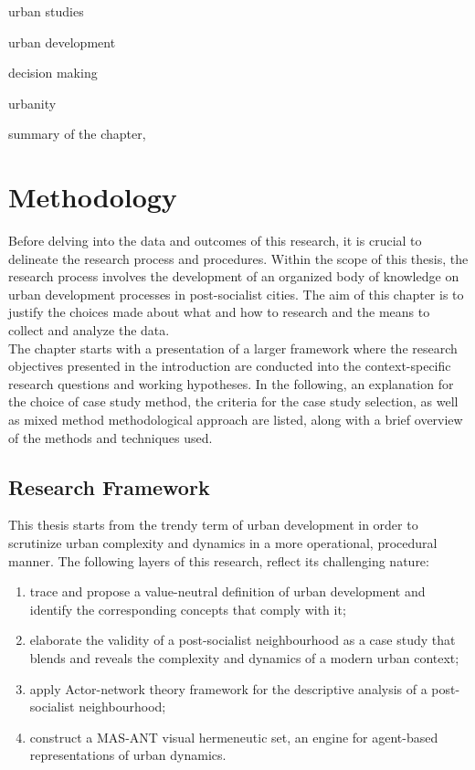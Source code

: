 \documentclass[11pt]{report}
\begin{document}
urban studies

urban development

decision making

urbanity

summary of the chapter,


\chapter{Methodology}

Before delving into the data  and outcomes of this research, it is crucial to delineate the research process and procedures. Within the scope of this thesis, the research process involves the development of an organized body of knowledge on urban development processes in post-socialist cities. The aim of this chapter is to justify the choices made about what and how to research and the means to collect and analyze the data.
\\
The chapter starts with a presentation of a larger framework where the research objectives presented in the introduction are conducted into the context-specific research questions and working hypotheses. In the following, an explanation for the choice of case study method, the criteria for the case study selection, as well as mixed method methodological approach are listed, along with a brief overview of the methods and techniques used.  

\section{Research Framework}

This thesis starts from the trendy term of urban development in order to scrutinize urban complexity and dynamics in a more operational, procedural manner. The following layers of this research, reflect its challenging nature:

\begin{enumerate}
\item trace and propose a value-neutral definition of urban development and identify the corresponding concepts that comply with it;
\item elaborate the validity of a post-socialist neighbourhood as a case study that blends and reveals the complexity and dynamics of a modern urban context;
\item apply Actor-network theory framework for the descriptive analysis of a post-socialist neighbourhood;
\item construct a MAS-ANT visual hermeneutic set, an engine for agent-based representations of urban dynamics.    
\end{enumerate}
\end{document}

